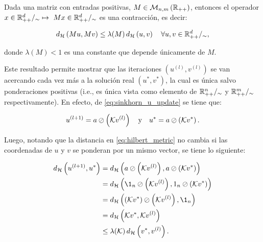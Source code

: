 \begin{teo}
	Dada una matriz con entradas positivas, $M\in\mathcal{M}_{n,m}\left(\mathbb{R}_{++}\right)$, entonces el operador $x\in\cone{d} \mapsto \ Mx\in\cone{d}$ es una contracción, es decir:

	\begin{equation*}
		d_{\mathcal{H}}\left(Mu,Mv\right) \leq \lambda(M)\, d_{\mathcal{H}}\left(u,v\right)
		\quad \forall u,v\in\mathbb{R}^{d}_{++}/_\sim,
	\end{equation*}

	donde $\lambda(M)<1$ es una constante que depende únicamente de $M$.

\end{teo}


Este resultado permite mostrar que las iteraciones $(u^{(l)},v^{(l)})$ se van acercando cada vez más a la solución real $(u^*,v^*)$, la cual es única salvo ponderaciones positivas (i.e., es única vista como elemento de $\mathbb{R}^{n}_{++}/_\sim$ y $\mathbb{R}^{m}_{++}/_\sim$ respectivamente). En efecto, de \eqref{eq:sinkhorn_u_update} se tiene que:

\begin{equation*}
	u^{(l+1)} = a \oslash \left(\mathcal{K} v^{(l)}\right)
	\quad\text{y}\quad
	u^* = a \oslash \left(\mathcal{K} v^*\right).
\end{equation*}

Luego, notando que la distancia en \eqref{eq:hilbert_metric} no cambia si las coordenadas de $u$ y $v$ se ponderan por un mismo vector, se tiene lo siguiente:

\begin{align*}
	\hmetric{u^{(l+1)}}{u^*} &= \hmetric{a \oslash \parent{\gibbs v^{(l)}}}{a \oslash \parent{\gibbs v^*}}\\
	&= \hmetric{\1_n \oslash \parent{\gibbs v^{(l)}}}{1_n \oslash \parent{\gibbs v^*}}\\
	&= \hmetric{\parent{\gibbs v^*} \oslash \parent{\gibbs v^{(l)}}}{\1_n}\\
	&= \hmetric{\gibbs v^*}{\gibbs v^{(l)}}\\
	&\leq \lambda(\gibbs)\, \hmetric{v^*}{v^{(l)}}.
\end{align*}

